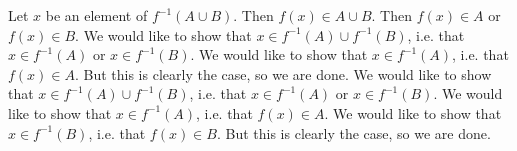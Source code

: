 \documentclass[a4paper,twoside,12pt]{article} %
\makeatletter
\DeclareRobustCommand{\_}{%
  \leavevmode\vbox{%
    \hrule\@width.4em
          \@height-.16ex
          \@depth\dimexpr.16ex+.28pt\relax}}
\makeatother
\begin{document}
\begin{center}
\begin{minipage}{120mm}
Let $x$ be an element of $f^{-1}(A\cup B)$. Then $f(x)\in A\cup B$. Then $f(x)\in A$ or $f(x)\in B$. We would like to show that $x\in f^{-1}(A)\cup f^{-1}(B)$, i.e. that $x\in f^{-1}(A)$ or $x\in f^{-1}(B)$. We would like to show that $x\in f^{-1}(A)$, i.e. that $f(x)\in A$. But this is clearly the case, so we are done. We would like to show that $x\in f^{-1}(A)\cup f^{-1}(B)$, i.e. that $x\in f^{-1}(A)$ or $x\in f^{-1}(B)$. We would like to show that $x\in f^{-1}(A)$, i.e. that $f(x)\in A$. We would like to show that $x\in f^{-1}(B)$, i.e. that $f(x)\in B$. But this is clearly the case, so we are done.
\end{minipage}
\end{center}
\end{document}
